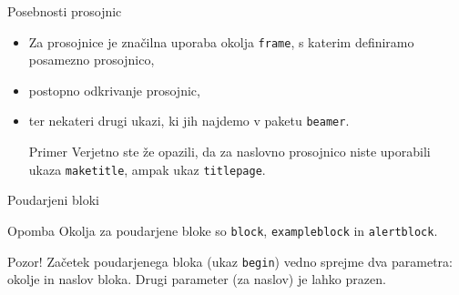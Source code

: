 \begin{frame}{Posebnosti prosojnic}

	
	\begin{itemize}
		\pause
		\item Za prosojnice je značilna uporaba okolja \texttt{frame},
		s katerim definiramo posamezno prosojnico,
		\pause
		\item postopno odkrivanje prosojnic,
		\pause
		\item ter nekateri drugi ukazi, ki jih najdemo v paketu \texttt{beamer}.
		\pause
		\begin{exampleblock}{Primer}
			Verjetno ste že opazili, da za naslovno prosojnico niste uporabili
			ukaza \texttt{maketitle}, ampak ukaz \texttt{titlepage}.
			\end{exampleblock}
	\end{itemize}
\end{frame}

\begin{frame}{Poudarjeni bloki}

		
		\begin{block}{Opomba}
			Okolja za poudarjene bloke so \texttt{block}, \texttt{exampleblock} in \texttt{alertblock}.
		\end{block}

		
		\begin{alertblock}{Pozor!}
			Začetek poudarjenega bloka (ukaz \texttt{begin}) vedno sprejme 
			dva parametra: okolje in naslov bloka.
			Drugi parameter (za naslov) je lahko prazen. 
		\end{alertblock}

\end{frame}

